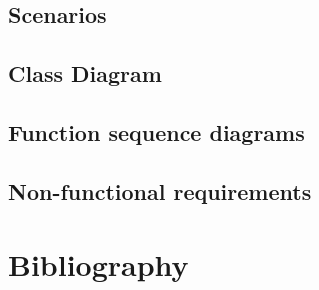 \documentclass{article}
\begin{document}
	\subsection{Scenarios}
	
	
	\subsection{Class Diagram}
	
	
	\newpage
	\subsection{Function sequence diagrams}
	
	
	\subsection{Non-functional requirements}
	

\newpage	    
\section{Bibliography}
    
\end{document}
